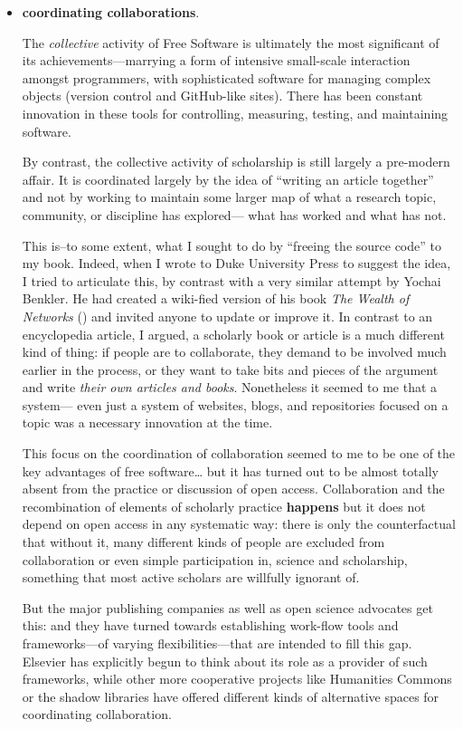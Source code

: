 \documentclass[11pt]{article}
\begin{document}
\begin{itemize}
\item \textbf{coordinating collaborations}.
\label{sec:org25f6d58}

The \emph{collective} activity of Free Software is ultimately the most significant of its achievements---marrying a form of intensive small-scale interaction amongst programmers, with sophisticated software for managing complex objects (version control and GitHub-like sites).  There has been constant innovation in these tools for controlling, measuring, testing, and maintaining software.

By contrast, the collective activity of scholarship is still largely a pre-modern affair.  It is coordinated largely by the idea of ``writing an article together'' and not by working to maintain some larger map of what a research topic, community, or discipline has explored--- what has worked and what has not. 

This is--to some extent, what I sought to do by ``freeing the source code'' to my book.  Indeed, when I wrote to Duke University Press to suggest the idea, I tried to articulate this, by contrast with a very similar attempt by Yochai Benkler.  He had created a wiki-fied version of his book \emph{The Wealth of Networks} (\cite{benkler2007wealnetw}) and invited anyone to update or improve it.  In contrast to an encyclopedia article, I argued, a scholarly book or article is a much different kind of thing:  if people are to collaborate, they demand to be involved much earlier in the process, or they want to take bits and pieces of the argument and write \emph{their own articles and books}.  Nonetheless it seemed to me that a system--- even just a system of websites, blogs, and repositories focused on a topic was a necessary innovation at the time. 

This focus on the coordination of collaboration seemed to me to be one of the key advantages of free software\ldots{} but it has turned out to be almost totally absent from the practice or discussion of open access.  Collaboration and the recombination of elements of scholarly practice \textbf{happens} but it does not depend on open access in any systematic way: there is only the counterfactual that without it, many different kinds of people are excluded from collaboration or even simple participation in, science and scholarship, something that most active scholars are willfully ignorant of.

But the major publishing companies as well as open science advocates get this: and they have turned towards establishing work-flow tools and frameworks---of varying flexibilities---that are intended to fill this gap.  Elsevier has explicitly begun to think about its role as a provider of such frameworks, while other more cooperative projects like Humanities Commons or the shadow libraries have offered different kinds of alternative spaces for coordinating collaboration. 


\end{itemize}
\end{document}
